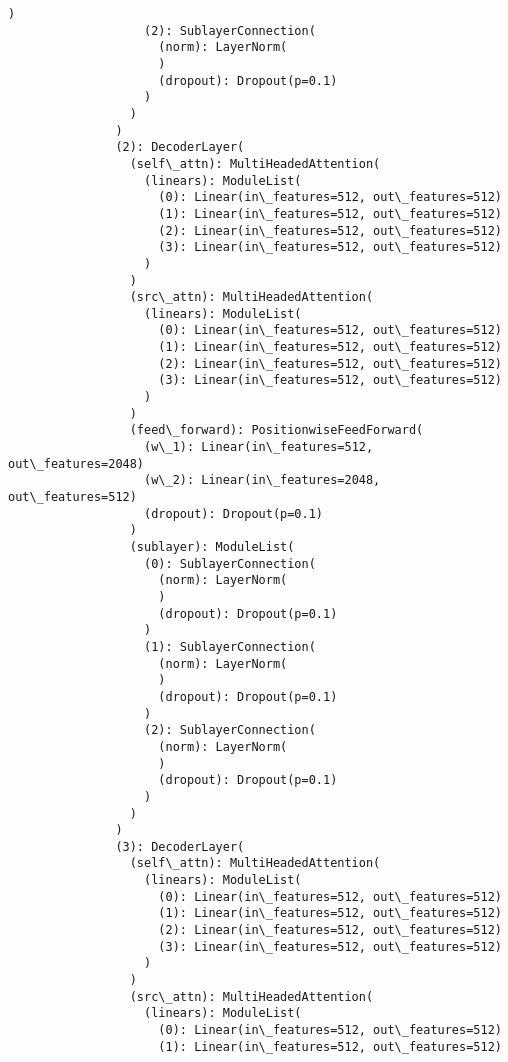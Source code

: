\documentclass[11pt]{article}
\begin{document}
\begin{Verbatim}[commandchars=\\\{\}]
                   )
                   (2): SublayerConnection(
                     (norm): LayerNorm(
                     )
                     (dropout): Dropout(p=0.1)
                   )
                 )
               )
               (2): DecoderLayer(
                 (self\_attn): MultiHeadedAttention(
                   (linears): ModuleList(
                     (0): Linear(in\_features=512, out\_features=512)
                     (1): Linear(in\_features=512, out\_features=512)
                     (2): Linear(in\_features=512, out\_features=512)
                     (3): Linear(in\_features=512, out\_features=512)
                   )
                 )
                 (src\_attn): MultiHeadedAttention(
                   (linears): ModuleList(
                     (0): Linear(in\_features=512, out\_features=512)
                     (1): Linear(in\_features=512, out\_features=512)
                     (2): Linear(in\_features=512, out\_features=512)
                     (3): Linear(in\_features=512, out\_features=512)
                   )
                 )
                 (feed\_forward): PositionwiseFeedForward(
                   (w\_1): Linear(in\_features=512, out\_features=2048)
                   (w\_2): Linear(in\_features=2048, out\_features=512)
                   (dropout): Dropout(p=0.1)
                 )
                 (sublayer): ModuleList(
                   (0): SublayerConnection(
                     (norm): LayerNorm(
                     )
                     (dropout): Dropout(p=0.1)
                   )
                   (1): SublayerConnection(
                     (norm): LayerNorm(
                     )
                     (dropout): Dropout(p=0.1)
                   )
                   (2): SublayerConnection(
                     (norm): LayerNorm(
                     )
                     (dropout): Dropout(p=0.1)
                   )
                 )
               )
               (3): DecoderLayer(
                 (self\_attn): MultiHeadedAttention(
                   (linears): ModuleList(
                     (0): Linear(in\_features=512, out\_features=512)
                     (1): Linear(in\_features=512, out\_features=512)
                     (2): Linear(in\_features=512, out\_features=512)
                     (3): Linear(in\_features=512, out\_features=512)
                   )
                 )
                 (src\_attn): MultiHeadedAttention(
                   (linears): ModuleList(
                     (0): Linear(in\_features=512, out\_features=512)
                     (1): Linear(in\_features=512, out\_features=512)

\end{Verbatim}
\end{document}
